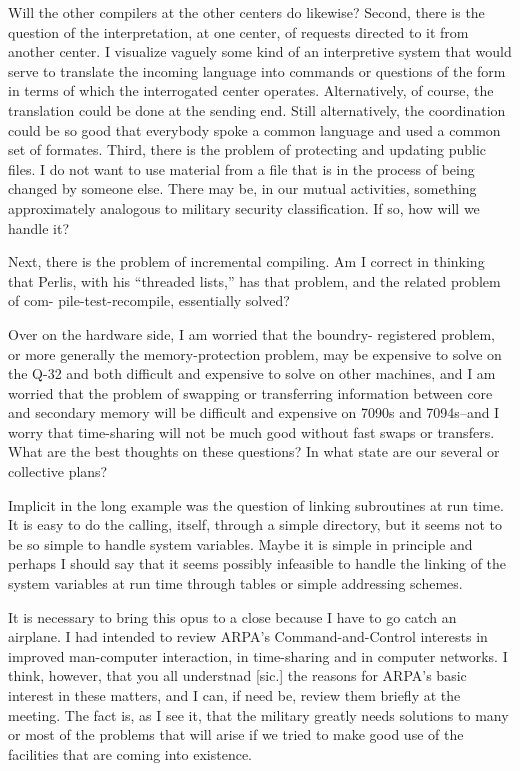 \documentclass{article}
\begin{document}
Will the other compilers at the other centers do likewise? Second, there is the question of the interpretation, at one center, of requests directed to it from another center. I visualize vaguely some kind of an interpretive system that would serve to translate the incoming language into commands or questions of the form in terms of which the interrogated center operates. Alternatively, of course, the translation could be done at the sending end. Still alternatively, the coordination could be so good that everybody spoke a common language and used a common set of formates. Third, there is the problem of protecting and updating public files. I do not want to use material from a file that is in the process of being changed by someone else. There may be, in our mutual activities, something approximately analogous to military security classification. If so, how will we handle it?

Next, there is the problem of incremental compiling. Am I correct in thinking that Perlis, with his ``threaded lists,'' has that problem, and the related problem of com- pile-test-recompile, essentially solved?

Over on the hardware side, I am worried that the boundry- registered problem, or more generally the memory-protection problem, may be expensive to solve on the Q-32 and both difficult and expensive to solve on other machines, and I am worried that the problem of swapping or transferring information between core and secondary memory will be difficult and expensive on 7090s and 7094s--and I worry that time-sharing will not be much good without fast swaps or transfers. What are the best thoughts on these questions? In what state are our several or collective plans?

Implicit in the long example was the question of linking subroutines at run time. It is easy to do the calling, itself, through a simple directory, but it seems not to be so simple to handle system variables. Maybe it is simple in principle and perhaps I should say that it seems possibly infeasible to handle the linking of the system variables at run time through tables or simple addressing schemes.

It is necessary to bring this opus to a close because I have to go catch an airplane. I had intended to review ARPA's Command-and-Control interests in improved man-computer interaction, in time-sharing and in computer networks. I think, however, that you all understnad [sic.] the reasons for ARPA's basic interest in these matters, and I can, if need be, review them briefly at the meeting. The fact is, as I see it, that the military greatly needs solutions to many or most of the problems that will arise if we tried to make good use of the facilities that are coming into existence.
\end{document}
